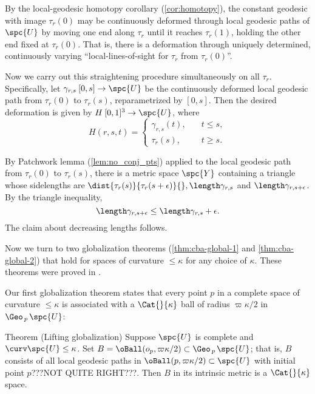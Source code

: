   By the local-geodesic homotopy corollary (\ref{cor:homotopy}), the constant geodesic with image $\tau_r(0)$ may be continuously deformed through local geodesic paths of $\spc{U}$ by moving one end along $\tau_r$ until it reaches $\tau_r(1)$,  holding the other end fixed at $\tau_r(0)$. That is, there is a deformation through uniquely determined, continuously varying ``local-lines-of-sight for $\tau_r$ from $\tau_r(0)$''. 

Now we carry out this straightening procedure simultaneously on all $\tau_r$.  Specifically, let $\gamma_{r,s}\:[0,s]\to \spc{U} $ be the continuously deformed local geodesic path from $\tau_r(0)$ to $\tau_r(s)$, reparametrized by $[0,s]$. Then the desired deformation is given by $H\:[0,1]^3\to \spc{U}$, where
$$
H(r,s,t)=
\begin{cases}
\gamma_{r,s}(t),\quad & t\le s,\\
\tau_r(s),\quad & t\ge s.
\end{cases}
$$

By Patchwork lemma (\ref{lem:no_conj_pts}) applied to the local geodesic path from $\tau_r(0)$ to $\tau_r(s)$, there is a metric space $\spc{Y}$ containing a triangle whose  sidelengths  are $\dist {\tau_r(s)}{\tau_r(s+\epsilon)}{}, \length \gamma_{r,s}$ and $\length \gamma_{r,s+\epsilon}$.  By the triangle inequality,
$$ \length \gamma_{r,s+\epsilon} \le \length \gamma_{r,s} + \epsilon.$$
The claim about decreasing lengths follows.
\qeds

Now we turn to two globalization theorems (\ref{thm:cba-global-1} and \ref{thm:cba-global-2}) that hold for spaces of curvature $\le\kappa$ for any choice of $\kappa$.  These theorems were proved in  \cite{a-b:cbc}.


Our first globalization theorem states that every point $p$ in a complete space of curvature $\le\kappa$ is associated with a $\Cat{}{\kappa}$ ball of radius $\varpi\kappa/2$ in $\Geo_{\,p\,}\spc{U}$:

 \begin{thm}{Theorem (Lifting globalization)}
\label{thm:cba-global-1}
Suppose $\spc{U}$ is complete and $\curv\spc{U}\le\kappa$. 
Set $B=\oBall(o_p,\varpi\kappa/2)\subset \Geo_{\,p\,}\spc{U}$;  that is, $B$ consists of all local geodesic paths in $\oBall(p,\varpi\kappa/2)\subset \spc{U}$ with initial point $p$???NOT QUITE RIGHT???.  
Then $B$ in its intrinsic metric  is a $\Cat{}{\kappa}$ space.
\end{thm}









